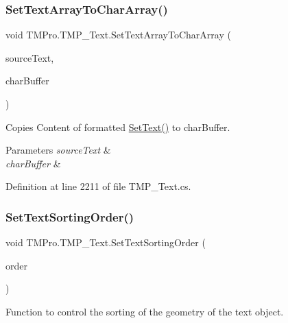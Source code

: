 \subsubsection{\texorpdfstring{SetTextArrayToCharArray()}{SetTextArrayToCharArray()}}
{\footnotesize\ttfamily void T\+M\+Pro.\+T\+M\+P\+\_\+\+Text.\+Set\+Text\+Array\+To\+Char\+Array (\begin{DoxyParamCaption}\item[{char \mbox{[}$\,$\mbox{]}}]{source\+Text,  }\item[{ref int \mbox{[}$\,$\mbox{]}}]{char\+Buffer }\end{DoxyParamCaption})\hspace{0.3cm}{\ttfamily [protected]}}



Copies Content of formatted \mbox{\hyperlink{class_t_m_pro_1_1_t_m_p___text_a8aebc83540d494fd574a92470762fdaa}{Set\+Text()}} to char\+Buffer. 


\begin{DoxyParams}{Parameters}
{\em source\+Text} & \\
\hline
{\em char\+Buffer} & \\
\hline
\end{DoxyParams}


Definition at line 2211 of file T\+M\+P\+\_\+\+Text.\+cs.

\mbox{\label{class_t_m_pro_1_1_t_m_p___text_a6679f4007ec2e6ad40093d9ef9dd3262}} 
\subsubsection{\texorpdfstring{SetTextSortingOrder()}{SetTextSortingOrder()}\hspace{0.1cm}{\footnotesize\ttfamily [1/2]}}
{\footnotesize\ttfamily void T\+M\+Pro.\+T\+M\+P\+\_\+\+Text.\+Set\+Text\+Sorting\+Order (\begin{DoxyParamCaption}\item[{\mbox{\hyperlink{namespace_t_m_pro_a29c2b2e41c29850d1bc0760ac64b1ee0}{Vertex\+Sorting\+Order}}}]{order }\end{DoxyParamCaption})\hspace{0.3cm}{\ttfamily [protected]}}



Function to control the sorting of the geometry of the text object. 



